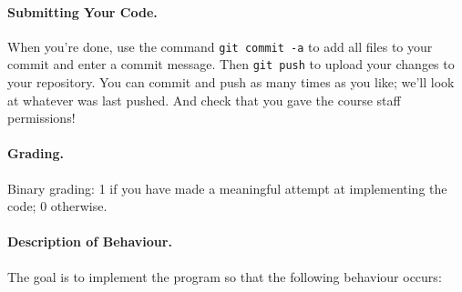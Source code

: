 \paragraph{Submitting Your Code.} When you're done, use the command \texttt{git commit -a} to add all files to your commit and enter a commit message. Then \texttt{git push} to upload your changes to your repository. You can commit and push as many times as you like; we'll look at whatever was last pushed. And check that you gave the course staff permissions!

\paragraph{Grading.} Binary grading: 1 if you have made a meaningful attempt at implementing the code; 0 otherwise.

\paragraph{Description of Behaviour.} The goal is to implement the program so that the following behaviour occurs:


